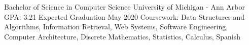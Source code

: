 

\begin{cventries}

  \cventry
    {Bachelor of Science in Computer Science} %
    {University of Michigan - Ann Arbor} %
    {GPA: 3.21} %
    {Expected Graduation May 2020} %
    {Coursework: Data Structures and Algorithms, Information Retrieval, Web Systems, Software Engineering, Computer Architecture, Discrete Mathematics, Statistics, Calculus, Spanish }
\end{cventries}
